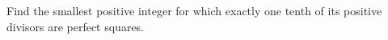 Find the smallest positive integer for which exactly one tenth of its positive divisors are perfect squares.
